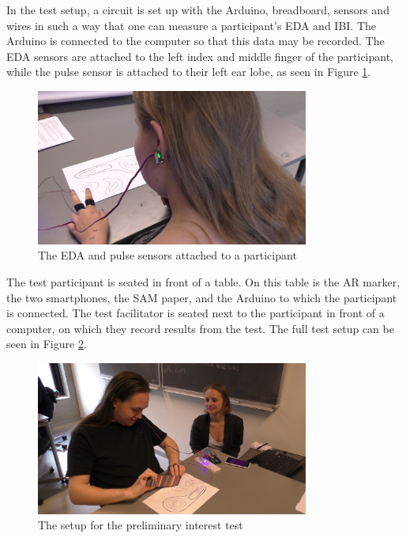 In the test setup, a circuit is set up with the Arduino, breadboard, sensors and wires in such a way that one can measure a participant’s EDA and IBI. The Arduino is connected to the computer so that this data may be recorded. The EDA sensors are attached to the left index and middle finger of the participant, while the pulse sensor is attached to their left ear lobe, as seen in Figure \ref{fig:pretest_ear}.

\begin{figure}[h!]
    \centering
    \includegraphics[width=0.8\textwidth]{figures/pretest_ear.png}
    \caption{The EDA and pulse sensors attached to a participant}\label{fig:pretest_ear}
\end{figure}

The test participant is seated in front of a table. On this table is the AR marker, the two smartphones, the SAM paper, and the Arduino to which the participant is connected. The test facilitator is seated next to the participant in front of a computer, on which they record results from the test. The full test setup can be seen in Figure \ref{fig:pretest_setup}.

\begin{figure}[h!]
    \centering
    \includegraphics[width=0.8\textwidth]{figures/pretest_setup.png}
    \caption{The setup for the preliminary interest test}\label{fig:pretest_setup}
\end{figure}

